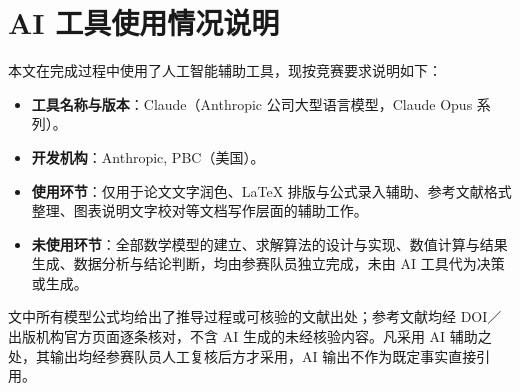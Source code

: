 \section*{AI 工具使用情况说明}

本文在完成过程中使用了人工智能辅助工具，现按竞赛要求说明如下：

\begin{itemize}[leftmargin=2em]
  \item \textbf{工具名称与版本}：Claude（Anthropic 公司大型语言模型，Claude Opus 系列）。
  \item \textbf{开发机构}：Anthropic, PBC（美国）。
  \item \textbf{使用环节}：仅用于论文文字润色、\LaTeX{} 排版与公式录入辅助、参考文献格式整理、图表说明文字校对等文档写作层面的辅助工作。
  \item \textbf{未使用环节}：全部数学模型的建立、求解算法的设计与实现、数值计算与结果生成、数据分析与结论判断，均由参赛队员独立完成，未由 AI 工具代为决策或生成。
\end{itemize}

文中所有模型公式均给出了推导过程或可核验的文献出处；参考文献均经 DOI／出版机构官方页面逐条核对，不含 AI 生成的未经核验内容。凡采用 AI 辅助之处，其输出均经参赛队员人工复核后方才采用，AI 输出不作为既定事实直接引用。
